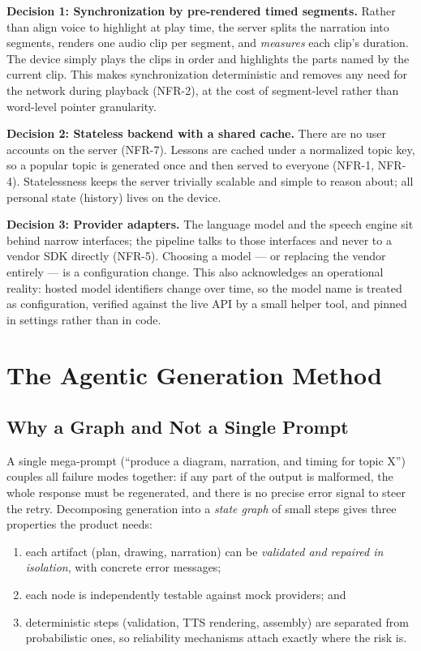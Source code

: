 \textbf{Decision 1: Synchronization by pre-rendered timed segments.} Rather
than align voice to highlight at play time, the server splits the narration
into segments, renders one audio clip per segment, and \emph{measures} each
clip's duration. The device simply plays the clips in order and highlights
the parts named by the current clip. This makes synchronization deterministic
and removes any need for the network during playback (NFR-2), at the cost of
segment-level rather than word-level pointer granularity.

\textbf{Decision 2: Stateless backend with a shared cache.} There are no user
accounts on the server (NFR-7). Lessons are cached under a normalized topic
key, so a popular topic is generated once and then served to everyone
(NFR-1, NFR-4). Statelessness keeps the server trivially scalable and simple
to reason about; all personal state (history) lives on the device.

\textbf{Decision 3: Provider adapters.} The language model and the speech
engine sit behind narrow interfaces; the pipeline talks to those interfaces
and never to a vendor SDK directly (NFR-5). Choosing a model --- or replacing
the vendor entirely --- is a configuration change. This also acknowledges an
operational reality: hosted model identifiers change over time, so the model
name is treated as configuration, verified against the live API by a small
helper tool, and pinned in settings rather than in code.

\section{The Agentic Generation Method}
\label{sec:genmethod}

\subsection{Why a Graph and Not a Single Prompt}

A single mega-prompt (``produce a diagram, narration, and timing for topic
X'') couples all failure modes together: if any part of the output is
malformed, the whole response must be regenerated, and there is no precise
error signal to steer the retry. Decomposing generation into a
\emph{state graph} of small steps gives three properties the product needs:

\begin{enumerate}
  \item each artifact (plan, drawing, narration) can be \emph{validated and
        repaired in isolation}, with concrete error messages;
  \item each node is independently testable against mock providers; and
  \item deterministic steps (validation, TTS rendering, assembly) are
        separated from probabilistic ones, so reliability mechanisms attach
        exactly where the risk is.
\end{enumerate}

